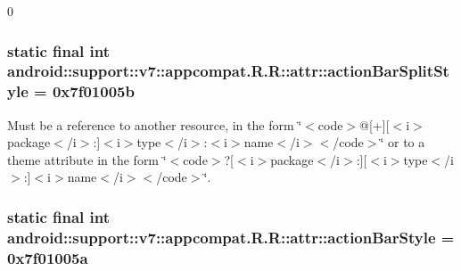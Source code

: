 0\hypertarget{classandroid_1_1support_1_1v7_1_1appcompat_1_1_r_1_1attr_5c6ad6330937b0baaf37523df3ca56a1}{
\subsubsection[{actionBarSplitStyle}]{\setlength{\rightskip}{0pt plus 5cm}static final int android::support::v7::appcompat.R.R::attr::actionBarSplitStyle = 0x7f01005b}}
\label{classandroid_1_1support_1_1v7_1_1appcompat_1_1_r_1_1attr_5c6ad6330937b0baaf37523df3ca56a1}


Must be a reference to another resource, in the form \char`\"{}$<$code$>$@\mbox{[}+\mbox{]}\mbox{[}$<$i$>$package$<$/i$>$:\mbox{]}$<$i$>$type$<$/i$>$:$<$i$>$name$<$/i$>$$<$/code$>$\char`\"{} or to a theme attribute in the form \char`\"{}$<$code$>$?\mbox{[}$<$i$>$package$<$/i$>$:\mbox{]}\mbox{[}$<$i$>$type$<$/i$>$:\mbox{]}$<$i$>$name$<$/i$>$$<$/code$>$\char`\"{}. \hypertarget{classandroid_1_1support_1_1v7_1_1appcompat_1_1_r_1_1attr_c9b9e6deb4dd4ae6671fbf7b442cc838}{
\subsubsection[{actionBarStyle}]{\setlength{\rightskip}{0pt plus 5cm}static final int android::support::v7::appcompat.R.R::attr::actionBarStyle = 0x7f01005a}}
\label{classandroid_1_1support_1_1v7_1_1appcompat_1_1_r_1_1attr_c9b9e6deb4dd4ae6671fbf7b442cc838}


